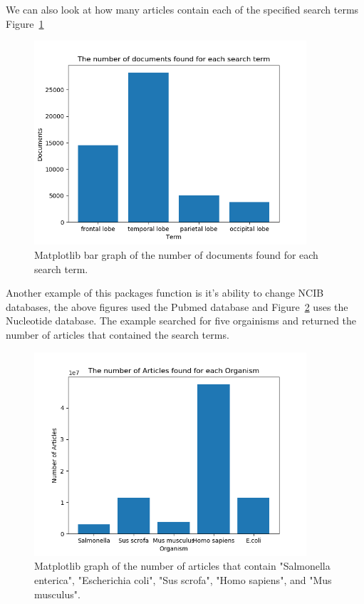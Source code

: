 \documentclass[12pt, letterpaper]{article}
\begin{document}
We can also look at how many articles contain each of the specified search terms Figure~\ref{fig:document}
%
\begin{figure}
  \centering
  \includegraphics[width=0.9\textwidth]{document}
  \caption{Matplotlib bar graph of the number of documents found for each search term.}
  \label{fig:document}
\end{figure}
%
Another example of this packages function is it's ability to change NCIB databases, the above figures used the Pubmed database and Figure~\ref{fig:organism} uses the Nucleotide database. The example searched for five orgainisms and returned the number of articles that contained the search terms.
%
\begin{figure}
  \centering
  \includegraphics[width=0.9\textwidth]{organism}
  \caption{Matplotlib graph of the number of articles that contain "Salmonella enterica", "Escherichia coli", "Sus scrofa", "Homo sapiens", and "Mus musculus".}
  \label{fig:organism}
\end{figure}
%
\end{document}
